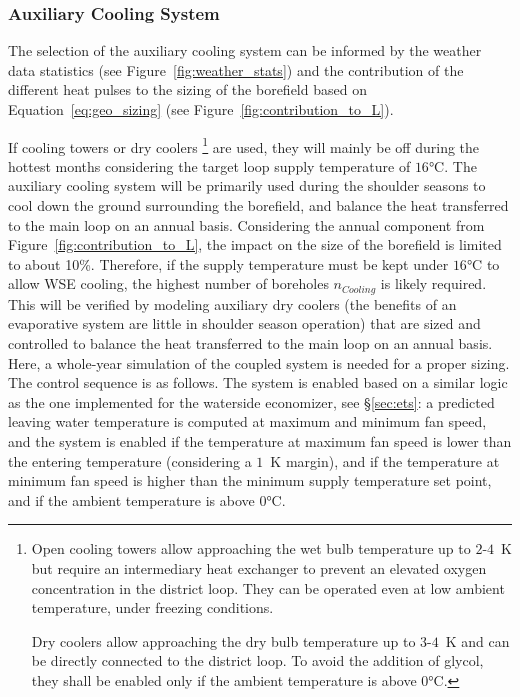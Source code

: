 \subsubsection{Auxiliary Cooling System} \label{sec:aux_cooling}

The selection of the auxiliary cooling system can be informed by the weather data statistics (see Figure~\ref{fig:weather_stats}) and the contribution of the different heat pulses to the sizing of the borefield based on Equation~\ref{eq:geo_sizing} (see Figure~\ref{fig:contribution_to_L}).

If cooling towers or dry coolers%
\footnote{
Open cooling towers allow approaching the wet bulb temperature up to $2$-$4$~K but require an intermediary heat exchanger to prevent an elevated oxygen concentration in the district loop. They can be operated even at low ambient temperature, under freezing conditions.

Dry coolers allow approaching the dry bulb temperature up to $3$-$4$~K and can be directly connected to the district loop. To avoid the addition of glycol, they shall be enabled only if the ambient temperature is above $0$°C.
}
are used, they will mainly be off during the hottest months considering the target loop supply temperature of $16$°C.
The auxiliary cooling system will be primarily used during the shoulder seasons to cool down the ground surrounding the borefield, and balance the heat transferred to the main loop on an annual basis.
Considering the annual component from Figure~\ref{fig:contribution_to_L}, the impact on the size of the borefield is limited to about 10\%. Therefore, if the supply temperature must be kept under $16$°C to allow WSE cooling, the highest number of boreholes $n_{Cooling}$ is likely required. This will be verified by modeling auxiliary dry coolers (the benefits of an evaporative system are little in shoulder season operation) that are sized and controlled to balance the heat transferred to the main loop on an annual basis.
Here, a whole-year simulation of the coupled system is needed for a proper sizing. The control sequence is as follows.
The system is enabled based on a similar logic as the one implemented for the waterside economizer, see §\ref{sec:ets}: a predicted leaving water temperature is computed at maximum and minimum fan speed, and  the system is enabled if the temperature at maximum fan speed is lower than the entering temperature (considering a $1$~K margin), and if the temperature at minimum fan speed is higher than the minimum supply temperature set point, and if the ambient temperature is above $0$°C.
